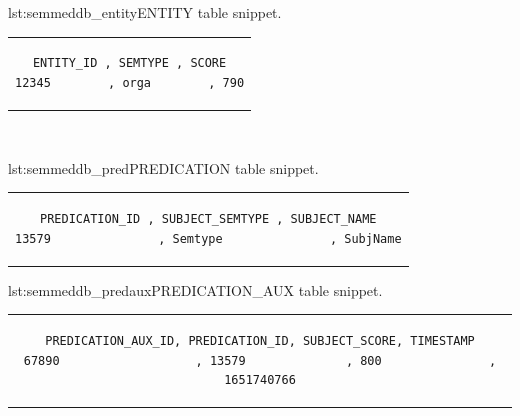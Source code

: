 \begin{minipage}{0.38\linewidth}
\begin{captionedlisting}{lst:semmeddb_entity}{ENTITY table snippet.}
\centering
\begin{tabular}{c}
\hspace{-1em}
{
\begin{lstlisting}[basicstyle=\ttfamily\small,label={list:example1},columns=flexible]
ENTITY_ID , SEMTYPE , SCORE
12345        , orga        , 790
\end{lstlisting}
}
\end{tabular}
\end{captionedlisting}
\end{minipage}
\,\,\,\,\hfill
\begin{minipage}{0.6\linewidth}
\begin{captionedlisting}{lst:semmeddb_pred}{PREDICATION table snippet.}
\centering
\begin{tabular}{c}
\hspace{-1em}
{
\begin{lstlisting}[basicstyle=\ttfamily\small,label={list:example1},columns=flexible]
PREDICATION_ID , SUBJECT_SEMTYPE , SUBJECT_NAME
13579               , Semtype               , SubjName
\end{lstlisting}
}
\end{tabular}
\end{captionedlisting}
\end{minipage}

\noindent\hspace{0.23\linewidth}\begin{minipage}{0.8\linewidth}
\begin{captionedlisting}{lst:semmeddb_predaux}{PREDICATION\_AUX table snippet.}
\centering
\begin{tabular}{c}
\hspace{-7em}
{
\begin{lstlisting}[basicstyle=\ttfamily\small,label={list:example1},columns=flexible]
PREDICATION_AUX_ID, PREDICATION_ID, SUBJECT_SCORE, TIMESTAMP
67890                   , 13579              , 800               , 1651740766
\end{lstlisting}
}
\end{tabular}
\end{captionedlisting}
\end{minipage}


